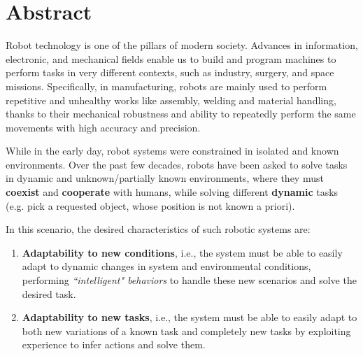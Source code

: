 \chapter*{Abstract}
\label{ch:abstract}
Robot technology is one of the pillars of modern society. Advances in information, electronic, and mechanical fields enable us to build and program machines to perform tasks in very different contexts, such as industry, surgery, and space missions.
\newline Specifically, in manufacturing, robots are mainly used to perform repetitive and unhealthy works like assembly, welding and material handling, thanks to their mechanical robustness and ability to repeatedly perform the same movements with high accuracy and precision.

While in the early day, robot systems were constrained in isolated and known environments. Over the past few decades, robots have been asked to solve tasks in dynamic and unknown/partially known environments, where they must \textbf{coexist} and \textbf{cooperate} with humans, while  solving different \textbf{dynamic} tasks \cite{bini2023multi} (e.g. pick a requested object, whose position is not known a priori). 

In this scenario, the desired characteristics of such robotic systems are:
\begin{enumerate}[label=\textbf{(\alph*)}]
\item \textbf{Adaptability to new conditions}, i.e., the system must be able to easily adapt to dynamic changes in system and environmental conditions, performing \textit{``intelligent" behaviors} to handle these new scenarios and solve the desired task.
\item \textbf{Adaptability to new tasks}, i.e., the system must be able to easily adapt to both new variations of a known task and completely new tasks by exploiting experience to infer actions and solve them.
\end{enumerate}

